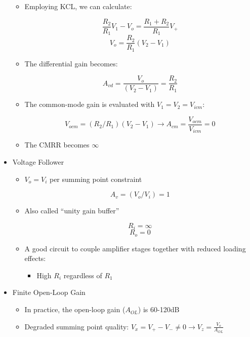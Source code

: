 \begin{itemize}
\begin{itemize}
      \item Employing KCL, we can calculate:

        $$\frac{R_2}{R_1}V_1-V_o=\frac{R_1+R_2}{R_1}V_+$$
        $$V_o=\frac{R_2}{R_1}(V_2-V_1)$$

      \item The differential gain becomes:

        $$A_{vd}=\frac{V_o}{(V_2-V_1)}=\frac{R_2}{R_1}$$

      \item The common-mode gain is evaluated with $V_1=V_2=V_{icm}$:

        $$V_{ocm}=(R_2/R_1)(V_2-V_1)\to A_{cm}=\frac{V_{ocm}}{V_{icm}}=0$$

      \item The CMRR becomes $\infty$

    \end{itemize}

  \item Voltage Follower

    \begin{itemize}

      \item $V_o=V_i$ per summing point constraint

        $$A_v=(V_o/V_i)=1$$

      \item Also called ``unity gain buffer''

        $$R_i=\infty$$
        $$R_o=0$$

      \item A good circuit to couple amplifier stages together with reduced loading effects:

        \begin{itemize}

          \item High $R_i$ regardless of $R_1$

        \end{itemize}

    \end{itemize}

  \item Finite Open-Loop Gain

    \begin{itemize}

      \item In practice, the open-loop gain ($A_{OL}$) is 60-120dB

      \item Degraded summing point quality: $V_x=V_+-V_-\neq0\to V_z=\frac{V_o}{A_{OL}}$


\end{itemize}
\end{itemize}

